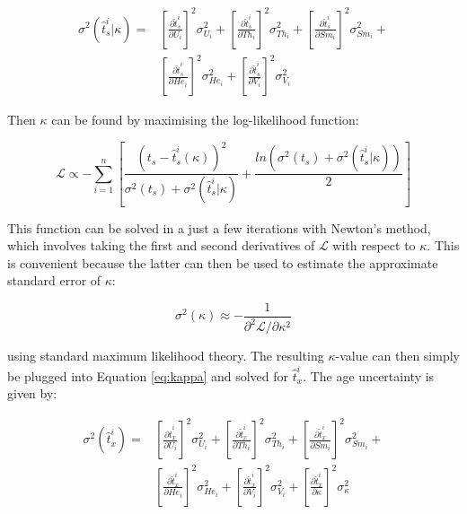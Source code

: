 \documentclass{article}
\begin{document}
\begin{equation}
\begin{array}{rl}
\sigma^2(\hat{t}_s^i|\kappa) = & \left[\frac{\partial \hat{t}_s^i}{\partial U_i}\right]^2 \sigma_{U_i}^2 +
\left[\frac{\partial \hat{t}_s^i}{\partial Th_i}\right]^2 \sigma_{Th_i}^2 +
\left[\frac{\partial \hat{t}_s^i}{\partial Sm_i}\right]^2 \sigma_{Sm_i}^2 + \\
~ & \left[\frac{\partial \hat{t}_s^i}{\partial He_i}\right]^2 \sigma_{He_i}^2 +
\left[\frac{\partial \hat{t}_s^i}{\partial V_i}\right]^2 \sigma_{V_i}^2
\end{array}
\label{eq:sigmai}
\end{equation}

Then $\kappa$ can be found by maximising the log-likelihood function:

\begin{equation}
\mathcal{L} \propto - \sum\limits_{i=1}^{n} \left[
\frac{\left(t_s - \hat{t}_s^i(\kappa)\right)^2}{\sigma^2(t_s) + \sigma^2(\hat{t}_s^i|\kappa)} 
+ \frac{ln\left(\sigma^2(t_s) + \sigma^2(\hat{t}_s^i|\kappa)\right)}{2} \right]
\label{eq:L}
\end{equation}

This function can be solved in a just a few iterations with Newton's
method, which involves taking the first and second derivatives of
$\mathcal{L}$ with respect to $\kappa$.  This is convenient because
the latter can then be used to estimate the approximate standard error
of $\kappa$:

\begin{equation}
\sigma^2(\kappa) \approx -\frac{1}{\partial^2\mathcal{L}/\partial\kappa^2}
\label{eq:fisher}
\end{equation}

using standard maximum likelihood theory.  The resulting
$\kappa$-value can then simply be plugged into Equation \ref{eq:kappa}
and solved for $\hat{t}_x^i$. The age uncertainty is given by:

\begin{equation}
\begin{array}{rl}
\sigma^2(\hat{t}_x^i) = 
& \left[\frac{\partial \hat{t}_x^i}{\partial U_i}\right]^2 \sigma_{U_i}^2 +
\left[\frac{\partial \hat{t}_x^i}{\partial Th_i}\right]^2 \sigma_{Th_i}^2 +
\left[\frac{\partial \hat{t}_x^i}{\partial Sm_i}\right]^2 \sigma_{Sm_i}^2 +\\
~ & \left[\frac{\partial \hat{t}_x^i}{\partial He_i}\right]^2 \sigma_{He_i}^2 +
\left[\frac{\partial \hat{t}_x^i}{\partial V_i}\right]^2 \sigma_{V_i}^2 +
\left[\frac{\partial \hat{t}_x^i}{\partial \kappa}\right]^2 \sigma_{\kappa}^2
\end{array}
\label{eq:sigmatxi}
\end{equation}
\end{document}
